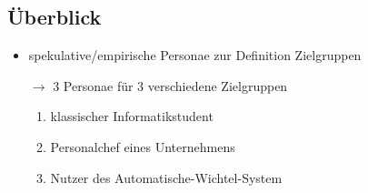 
\subsection{Überblick}
\begin{frame}
	\begin{itemize}
		\item spekulative/empirische Personae zur Definition Zielgruppen \pause
		\item[$\rightarrow$] 3 Personae für 3 verschiedene Zielgruppen \pause
		\begin{enumerate}
			\item klassischer Informatikstudent \pause
			\item Personalchef eines Unternehmens \pause
			\item Nutzer des Automatische-Wichtel-System
		\end{enumerate}
	\end{itemize}
\end{frame}

